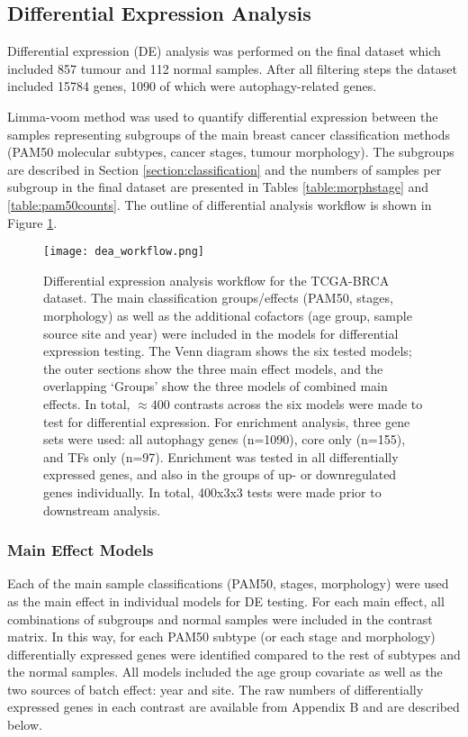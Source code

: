     \subsection{Differential Expression Analysis}
    
    Differential expression (DE) analysis was performed on the final dataset which included 857 tumour and 112 normal samples. After all filtering steps the dataset included 15784 genes, 1090 of which were autophagy-related genes. 

    Limma-voom method was used to quantify differential expression between the samples representing subgroups of the main breast cancer classification methods (PAM50 molecular subtypes, cancer stages, tumour morphology). The subgroups are described in Section \ref{section:classification} and the numbers of samples per subgroup in the final dataset are presented in Tables \ref{table:morphstage} and \ref{table:pam50counts}. The outline of differential analysis workflow is shown in Figure \ref{fig:deaworkflow}. 

       
            \begin{figure}[!h]
            \centering
            \texttt{[image: dea\_workflow.png]} 
            \caption[Differential Expression Analysis workflow]{Differential expression analysis workflow for the TCGA-BRCA dataset. The main classification groups/effects (PAM50, stages, morphology) as well as the additional cofactors (age group, sample source site and year) were included in the models for differential expression testing. The Venn diagram shows the six tested models; the outer sections show the three main effect models, and the overlapping ‘Groups' show the three models of combined main effects. In total, $\approx 400$ contrasts across the six models were made to test for differential expression. For enrichment analysis, three gene sets were used: all autophagy genes (n=1090), core only (n=155), and TFs only (n=97). Enrichment was tested in all differentially expressed genes, and also in the groups of up- or downregulated genes individually. In total, 400x3x3 tests were made prior to downstream analysis.  }
            \label{fig:deaworkflow}
            \end{figure}

        \subsubsection{Main Effect Models}
        
        Each of the main sample classifications (PAM50, stages, morphology) were used as the main effect in individual models for DE testing. For each main effect, all combinations of subgroups and normal samples were included in the contrast matrix. In this way, for each PAM50 subtype (or each stage and morphology) differentially expressed genes were identified compared to the rest of subtypes and the normal samples. All models included the age group covariate as well as the two sources of batch effect: year and site. The raw numbers of differentially expressed genes in each contrast are available from Appendix B and are described below.

